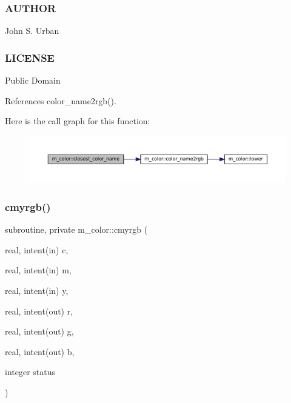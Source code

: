  \subsubsection*{A\+U\+T\+H\+OR}

John S. Urban \subsubsection*{L\+I\+C\+E\+N\+SE}

Public Domain 

References color\+\_\+name2rgb().

Here is the call graph for this function\+:\nopagebreak
\begin{figure}[H]
\begin{center}
\leavevmode
\includegraphics[width=350pt]{namespacem__color_acad72628ee0b77cf87f40cd46734fb18_cgraph}
\end{center}
\end{figure}
\mbox{\label{namespacem__color_ab91687e87d0901874e52efe5933e3044}} 
\subsubsection{\texorpdfstring{cmyrgb()}{cmyrgb()}}
{\footnotesize\ttfamily subroutine, private m\+\_\+color\+::cmyrgb (\begin{DoxyParamCaption}\item[{real, intent(in)}]{c,  }\item[{real, intent(in)}]{m,  }\item[{real, intent(in)}]{y,  }\item[{real, intent(out)}]{r,  }\item[{real, intent(out)}]{g,  }\item[{real, intent(out)}]{b,  }\item[{integer}]{status }\end{DoxyParamCaption})\hspace{0.3cm}{\ttfamily [private]}}


